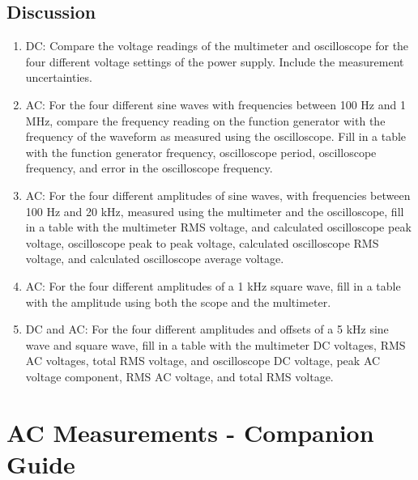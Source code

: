 \section{{\bf Discussion}}
\begin{enumerate}[resume]
\item DC: Compare the voltage readings of the multimeter and oscilloscope for the four different voltage settings of the power supply. Include the measurement uncertainties.

\item AC: For the four different sine waves with frequencies between 100 Hz and 1 MHz, compare the frequency reading on the function generator with the frequency of the waveform as measured using the oscilloscope. Fill in a table with the function generator frequency, oscilloscope period, oscilloscope frequency, and error in the oscilloscope frequency.

\item AC: For the four different amplitudes of sine waves, with frequencies between 100 Hz and 20 kHz, measured using the multimeter and the oscilloscope, fill in a table with the multimeter RMS voltage, and calculated oscilloscope peak voltage, oscilloscope peak to peak voltage, calculated oscilloscope RMS voltage, and calculated oscilloscope average voltage.

\item AC: For the four different amplitudes of a 1 kHz square wave, fill in a table with the amplitude using both the scope and the multimeter.

\item DC and AC: For the four different amplitudes and offsets of a 5 kHz sine wave and square wave, fill in a table with the multimeter DC voltages, RMS AC voltages, total RMS voltage, and oscilloscope DC voltage, peak AC voltage component, RMS AC voltage, and total RMS voltage.
\end{enumerate}


\AtEndDocument{\clearpage\ifodd\value{page}\else\null\clearpage\fi} %


%
%


\chapter{AC Measurements - Companion Guide}

